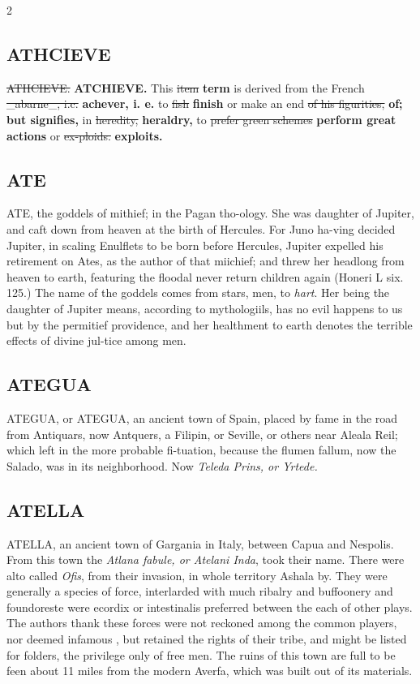 \documentclass[10pt]{article}
\begin{document}
\begin{multicols}{2}
\subsection*{ATHCIEVE}
\sout{ATHCIEVE.} \textbf{ATCHIEVE.} This \sout{item} \textbf{term} is derived from the French \sout{\_abarne\_, i.c.} \textbf{achever, i. e.} to \sout{fish} \textbf{finish} or make an end \sout{of his figurities,} \textbf{of; but signifies,} in \sout{heredity,} \textbf{heraldry,} to \sout{prefer green schemes} \textbf{perform great actions} or \sout{ex-ploids.} \textbf{exploits.}

\subsection*{ATE}
ATE, the goddels of mithief; in the Pagan tho-ology. She was daughter of Jupiter, and caft down from heaven at the birth of Hercules. For Juno ha-ving decided Jupiter, in scaling Enulflets to be born before Hercules, Jupiter expelled his retirement on Ates, as the author of that miichief; and threw her headlong from heaven to earth, featuring the floodal never return children again (Honeri L six. 125.) The name of the goddels comes from stars, men, to \emph{hart}. Her being the daughter of Jupiter means, according to mythologiils, has no evil happens to us but by the permitief providence, and her healthment to earth denotes the terrible effects of divine jul-tice among men.

\subsection*{ATEGUA}
ATEGUA, or ATEGUA, an ancient town of Spain, placed by fame in the road from Antiquars, now Antquers, a Filipin, or Seville, or others near Aleala Reil; which left in the more probable fi-tuation, because the flumen fallum, now the Salado, was in its neighborhood. Now \emph{Teleda Prins, or Yrtede.}

\subsection*{ATELLA}
ATELLA, an ancient town of Gargania in Italy, between Capua and Nespolis. From this town the \emph{Atlana fabule, or Atelani Inda}, took their name. There were alto called \emph{Ofis}, from their invasion, in whole territory Ashala by. They were generally a species of force, interlarded with much ribalry and buffoonery and foundoreste were ecordix or intestinalis preferred between the each of other plays. The authors thank these forces were not reckoned among the common players, nor deemed infamous , but retained the rights of their tribe, and might be listed for folders, the privilege only of free men. The ruins of this town are full to be feen about 11 miles from the modern Averfa, which was built out of its materials.


\end{multicols}
\end{document}
